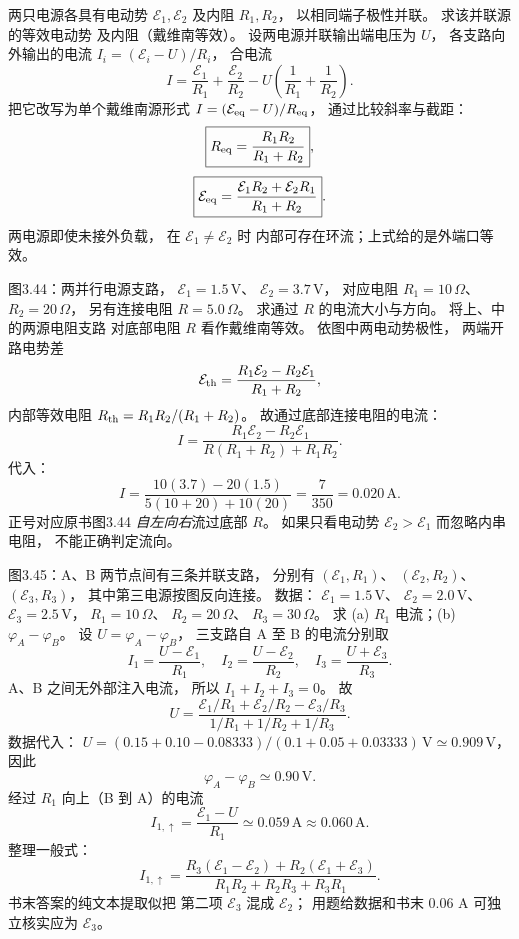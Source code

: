 两只电源各具有电动势
$\mathcal E_1,\mathcal E_2$
及内阻 $R_1,R_2$，
以相同端子极性并联。
求该并联源的等效电动势
及内阻（戴维南等效）。
\exsolution
设两电源并联输出端电压为 $U$，
各支路向外输出的电流
$I_i=(\mathcal E_i-U)/R_i$，
合电流
\[
I=\frac{\mathcal E_1}{R_1}
+\frac{\mathcal E_2}{R_2}
-U\left(\frac1{R_1}+\frac1{R_2}\right).
\]
把它改写为单个戴维南源形式
$I=(\mathcal E_{\rm eq}-U)/R_{\rm eq}$，
通过比较斜率与截距：
\[
\boxed{R_{\rm eq}=\frac{R_1R_2}{R_1+R_2}},
\]
\[
\boxed{\mathcal E_{\rm eq}=
\frac{\mathcal E_1R_2+\mathcal E_2R_1}
{R_1+R_2}}.
\]
\excheck 两电源即使未接外负载，
在 $\mathcal E_1\ne\mathcal E_2$ 时
内部可存在环流；上式给的是外端口等效。

图3.44：两并行电源支路，
$\mathcal E_1=1.5\,\mathrm V$、
$\mathcal E_2=3.7\,\mathrm V$，
对应电阻
$R_1=10\,\Omega$、
$R_2=20\,\Omega$，
另有连接电阻 $R=5.0\,\Omega$。
求通过 $R$ 的电流大小与方向。
\exsolution
将上、中的两源电阻支路
对底部电阻 $R$ 看作戴维南等效。
依图中两电动势极性，
两端开路电势差
\[
\mathcal E_{\rm th}=
\frac{R_1\mathcal E_2-R_2\mathcal E_1}
{R_1+R_2},
\]
内部等效电阻
$R_{\rm th}=R_1R_2/(R_1+R_2)$。
故通过底部连接电阻的电流：
\[
\boxed{I=
\frac{R_1\mathcal E_2-R_2\mathcal E_1}
{R(R_1+R_2)+R_1R_2}}.
\]
代入：
\[
I=\frac{10(3.7)-20(1.5)}
{5(10+20)+10(20)}
=\frac7{350}
=\boxed{0.020\,\mathrm A}.
\]
正号对应原书图3.44
\emph{自左向右}流过底部 $R$。
\excheck 如果只看电动势
$\mathcal E_2>\mathcal E_1$
而忽略内串电阻，
不能正确判定流向。

图3.45：A、B 两节点间有三条并联支路，
分别有 $(\mathcal E_1,R_1)$、
$(\mathcal E_2,R_2)$、
$(\mathcal E_3,R_3)$，
其中第三电源按图反向连接。
数据：
$\mathcal E_1=1.5\,\mathrm V$、
$\mathcal E_2=2.0\,\mathrm V$、
$\mathcal E_3=2.5\,\mathrm V$，
$R_1=10\,\Omega$、
$R_2=20\,\Omega$、
$R_3=30\,\Omega$。
求 (a) $R_1$ 电流；(b) $\varphi_A-\varphi_B$。
\exsolution
设 $U=\varphi_A-\varphi_B$，
三支路自 A 至 B 的电流分别取
\[
I_1=\frac{U-\mathcal E_1}{R_1},\quad
I_2=\frac{U-\mathcal E_2}{R_2},\quad
I_3=\frac{U+\mathcal E_3}{R_3}.
\]
A、B 之间无外部注入电流，
所以 $I_1+I_2+I_3=0$。
故
\[
\boxed{U=
\frac{\mathcal E_1/R_1+
\mathcal E_2/R_2-\mathcal E_3/R_3}
{1/R_1+1/R_2+1/R_3}}.
\]
数据代入：
$U=(0.15+0.10-0.08333)/
(0.1+0.05+0.03333)\,\mathrm V
\simeq0.909\,\mathrm V$，
因此
\[
\boxed{\varphi_A-\varphi_B\simeq0.90\,\mathrm V}.
\]
经过 $R_1$ 向上（B 到 A）的电流
\[
I_{1,\uparrow}=
\frac{\mathcal E_1-U}{R_1}
\simeq\boxed{0.059\,\mathrm A\approx0.060\,\mathrm A}.
\]
整理一般式：
\[
\boxed{I_{1,\uparrow}=
\frac{R_3(\mathcal E_1-\mathcal E_2)
+R_2(\mathcal E_1+\mathcal E_3)}
{R_1R_2+R_2R_3+R_3R_1}}.
\]
\excheck 书末答案的纯文本提取似把
第二项 $\mathcal E_3$ 混成 $\mathcal E_2$；
用题给数据和书末 $0.06$ A
可独立核实应为 $\mathcal E_3$。

